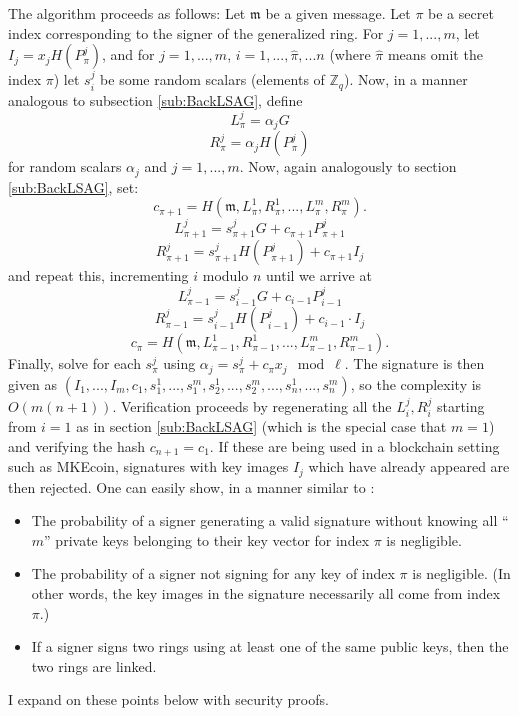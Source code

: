 \documentclass[12pt,oneside,english]{amsart}
\numberwithin{equation}{section}
\numberwithin{figure}{section}
\theoremstyle{plain}
\theoremstyle{plain}
\theoremstyle{remark}
\theoremstyle{plain}
\theoremstyle{remark}
\theoremstyle{remark}
\theoremstyle{plain}
\theoremstyle{definition}
\begin{document}
The algorithm proceeds as follows: Let $\mathfrak{m}$ be a given
message. Let $\pi$ be a secret index corresponding to the signer
of the generalized ring. For $j=1,...,m$, let $I_{j}=x_{j}H\left(P_{\pi}^{j}\right)$,
and for $j=1,...,m$, $i=1,...,\hat{\pi},...n$ (where $\hat{\pi}$
means omit the index $\pi$) let $s_{i}^{j}$ be some random scalars (elements of $\mathbb{Z}_q$).
Now, in a manner analogous to subsection \ref{sub:BackLSAG},
define 
\[
L_{\pi}^{j}=\alpha_{j}G
\]
\[
R_{\pi}^{j}=\alpha_{j}H\left(P_{\pi}^{j}\right)
\]
 for random scalars $\alpha_j$ and $j=1,...,m$. Now, again analogously
to section \ref{sub:BackLSAG}, set:
\[
c_{\pi+1}=H\left(\mathfrak{m},L_{\pi}^{1},R_{\pi}^{1},...,L_{\pi}^{m},R_{\pi}^{m}\right).
\]
\[
L_{\pi+1}^{j}=s_{\pi+1}^{j}G+c_{\pi+1}P_{\pi+1}^{j}
\]
\[
R_{\pi+1}^{j}=s_{\pi+1}^{j}H\left(P_{\pi+1}^{j}\right)+c_{\pi+1}I_{j}
\]
 and repeat this, incrementing $i$ modulo $n$ until we arrive at
\[
L_{\pi-1}^{j}=s_{i-1}^{j}G+c_{i-1}P_{i-1}^{j}
\]
\[
R_{\pi-1}^{j}=s_{i-1}^{j}H\left(P_{i-1}^{j}\right)+c_{i-1}\cdot I_{j}
\]
\[
c_{\pi}=H\left(\mathfrak{m},L_{\pi-1}^{1},R_{\pi-1}^{1},...,L_{\pi-1}^{m},R_{\pi-1}^{m}\right).
\]
 Finally, solve for each $s_{\pi}^{j}$ using $\alpha_{j}=s_{\pi}^{j}+c_{\pi}x_{j} \mod \ell$.
The signature is then given as $\left(I_{1},...,I_{m},c_{1},s_{1}^{1},...,s_{1}^{m},s_{2}^{1},...,s_{2}^{m},...,s_{n}^{1},...,s_{n}^{m}\right)$,
so the complexity is $O\left(m\left(n+1\right)\right).$ 
Verification
proceeds by regenerating all the $L_{i}^{j},R_{i}^{j}$ starting from
$i=1$ as in section \ref{sub:BackLSAG} (which is the special case that $m=1$) and verifying
the hash $c_{n+1}=c_{1}.$ 
If these are being used in a blockchain setting such as MKEcoin, signatures with key images $I_j$ which have already appeared are then rejected. 
One can easily show, in a manner similar to \cite{LWW}: 
\begin{itemize}
\item The probability of a signer generating a valid signature without knowing
all ``$m$'' private keys belonging to their key vector for index $\pi$ is negligible. 
\item The probability of a signer not signing for any key of index $\pi$
is negligible. (In other words, the key images in the signature necessarily
all come from index $\pi$.)
\item If a signer signs two rings using at least one of the same public keys, then the two rings are linked.
\end{itemize}
I expand on these points below with security proofs. 
\end{document}
